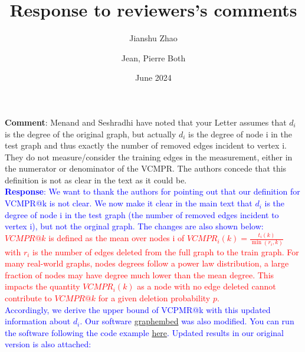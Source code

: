 \documentclass{article}
\title{Response to reviewers's comments}
\author[1]{Jianshu Zhao}
\author[2,*]{Jean, Pierre Both}
\affil[1]{Center for Bioinformatics and Computational Genomics, Georgia Institute of Technology, Atlanta, Georgia, USA}
\affil[2]{Université Paris-Saclay, CEA, List, Palaiseau, France. (Retired)}
\affil[*]{Corresponding author : jeanpierre.both@gmail.com}
\date{June 2024}
\begin{document}
\maketitle

\textbf{Comment}: Menand and Seshradhi have noted that your Letter assumes that $d_i$ 
is the degree of the original graph, but actually $d_i$ is the degree 
of node i in the test graph and thus exactly the number of removed 
edges incident to vertex i. They do not measure/consider the training 
edges in the measurement, either in the numerator or denominator of the VCMPR. 
The authors concede that this definition is not as clear in the text as it could be.\\

\textcolor{blue}{\textbf{Response}: We want to thank the authors for pointing out that our definition for VCMPR@k is not clear.
We now make it clear in the main text that $d_i$ is the degree 
of node i in the test graph (the number of removed 
edges incident to vertex i), but not the orginal graph. The changes are also shown below:}\\

\textcolor{red}{$VCMPR@k$ is defined as the mean over nodes i of  $ VCMPR_{i}(k)= \frac{t_{i}(k)}{\min(r_{i},k)}$ with $ r_{i} $ is the number of edges deleted from the full graph to the train graph.
For many real-world graphs, nodes degrees follow a power law distribution, a large fraction of nodes may have degree much lower than the mean degree.
This impacts the quantity $ VCMPR_{i}(k)$ as a node with no edge deleted cannot contribute to $VCMPR@k$ for a given deletion probability $p$.}\\


\textcolor{blue}{Accordingly, we derive the upper bound of VCPMR@k with this updated information about $d_i$.  Our software \href{https://github.com/jean-pierreBoth/graphembed}{\color{blue}graphembed} was also modified. 
You can run the software following the code example \href{https://github.com/jean-pierreBoth/linkauc/blob/master/running_graphembed.md}{\color{blue}here}.
Updated results in our original version is also attached:}\\
\end{document}
